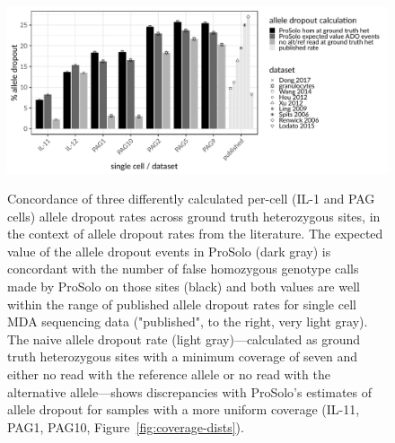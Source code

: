 \documentclass[12pt,inline]{wlscirep}
\begin{document}
\begin{figure}[!tpb]
  \includegraphics[width=\linewidth]{figs/prosolo_ado-rate_expected-vs-ground-truth.pdf} \\
  \caption{
    Concordance of three differently calculated per-cell (IL-1 and PAG cells) allele dropout rates across ground truth heterozygous sites, in the context of allele dropout rates from the literature\cite{wang_clonal_2014,hou_single-cell_2012,xu_single-cell_2012,ling_evaluation_2009,spits_whole-genome_2006,spits_optimization_2006,renwick_proof_2006,lodato_somatic_2015}.
    The expected value of the allele dropout events in ProSolo (dark gray) is concordant with the number of false homozygous genotype calls made by ProSolo on those sites (black) and both values are well within the range of published allele dropout rates for single cell MDA sequencing data ("published", to the right, very light gray).
    The naive allele dropout rate (light gray)---calculated as ground truth heterozygous sites with a minimum coverage of seven and either no read with the reference allele or no read with the alternative allele---shows discrepancies with ProSolo's estimates of allele dropout for samples with a more uniform coverage (IL-11, PAG1, PAG10, Figure~\ref{fig:coverage-dists}).
  }
  \label{fig:allele-dropout}
\end{figure}
\end{document}
